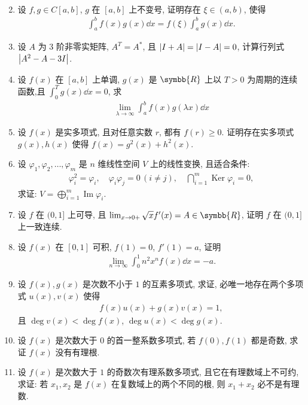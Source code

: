 \documentclass{ctexart}
\let\ge\geqslant
\newcommand{\limit}[2]{\lim_{#1 \to #2}}
\newcommand{\R}{\ensuremath{\symbb{R}}}
\DeclareMathOperator{\Image}{Im}
\DeclareMathOperator{\Ker}{Ker}
\begin{document}
\begin{enumerate}[series=exer]
\begin{align*}
    \end{align*}
    \item 设 $ f, g \in C[a, b] $, $ g $ 在 $ [a, b] $ 上不变号, 证明存在 $ \xi\in (a, b) $, 使得
    \begin{align*}
        \int_{a}^{b} f(x)g(x) \dd{x} = f(\xi)\int_{a}^{b} g(x) \dd{x}.
    \end{align*}   
    \item 设 $ A $ 为 $ 3 $ 阶非零实矩阵, $ A^{T} = A^{*} $, 且 $ \abs{I + A} = \abs{I - A} = 0 $, 计算行列式 $ \abs{A^{2} - A - 3I} $.
    \item 设 $ f(x) $ 在 $ [a, b] $ 上单调, $ g(x) $ 是 $ \R $ 上以 $ T>0 $ 为周期的连续函数,且 $ \int_{0}^{T} g(x) \dd{x} = 0 $, 求
    \begin{align*}
        \limit{\lambda}{\infty} \int_{a}^{b} f(x)g(\lambda x) \dd{x}
    \end{align*}
    \item 设 $ f(x) $ 是实多项式, 且对任意实数 $ r $, 都有 $ f(r) \ge 0 $. 证明存在实多项式 $ g(x), h(x) $ 使得 $ f(x) = g^{2}(x) + h^{2}(x) $.   
    \item 设 $ \varphi_{1}, \varphi_{2}, \dots, \varphi_{m} $ 是 $ n $ 维线性空间 $ V $ 上的线性变换, 且适合条件:
    \begin{align*}
        \varphi_{i}^{2} = \varphi_{i}, \quad \varphi_{i}\varphi_{j} = 0\,(i\ne j), \quad \bigcap_{i=1}^{m}\Ker\varphi_{i} = 0,
    \end{align*}
    求证: $ V = \bigoplus_{i=1}^{m}\Image\varphi_{i} $. 
    \item 设 $ f $ 在 $ (0, 1] $ 上可导, 且 $ \limit{x}{0+} \sqrt{x} f'(x) = A \in \R $, 证明 $ f $ 在 $ (0, 1] $ 上一致连续. 
    \item 设 $ f(x) $ 在 $ [0, 1] $ 可积, $ f(1) = 0 $, $ f'(1) = a $, 证明
    \begin{align*}
        \limit{n}{\infty}\int_{0}^{1}n^{2}x^{n}f(x)\dd{x} = -a.
    \end{align*}
    \item 设 $ f(x), g(x) $ 是次数不小于 $ 1 $ 的互素多项式, 求证, 必唯一地存在两个多项式 $ u(x), v(x) $ 使得
    \begin{align*}
        f(x)u(x) + g(x)v(x) = 1,
    \end{align*}
    且 $ \deg v(x) < \deg f(x) $, $ \deg u(x) < \deg g(x) $.  
    \item 设 $ f(x) $ 是次数大于 $ 0 $ 的首一整系数多项式, 若 $ f(0), f(1) $ 都是奇数, 求证 $ f(x) $ 没有有理根.
    \item 设 $ f(x) $ 是次数大于 $ 1 $ 的奇数次有理系数多项式, 且它在有理数域上不可约, 求证: 若 $ x_{1}, x_{2} $ 是 $ f(x) $ 在复数域上的两个不同的根, 则 $ x_{1} + x_{2} $ 必不是有理数.

\end{enumerate}
\end{document}
